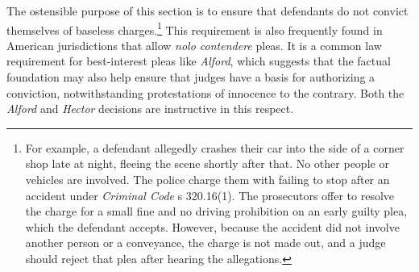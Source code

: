The ostensible purpose of this section is to ensure that defendants do not convict themselves of baseless charges.\footnote{For example, a defendant allegedly crashes their car into the side of a corner shop late at night, fleeing the scene shortly after that. No other people or vehicles are involved. The police charge them with failing to stop after an accident under \textit{Criminal Code} s 320.16(1). The prosecutors offer to resolve the charge for a small fine and no driving prohibition on an early guilty plea, which the defendant accepts. However, because the accident did not involve another person or a conveyance, the charge is not made out, and a judge should reject that plea after hearing the allegations.} This requirement is also frequently found in American jurisdictions that allow \textit{nolo contendere} pleas. It is a common law requirement for best-interest pleas like \textit{Alford}, which suggests that the factual foundation may also help ensure that judges have a basis for authorizing a conviction, notwithstanding protestations of innocence to the contrary. Both the \textit{Alford} and \textit{Hector} decisions are instructive in this respect.

